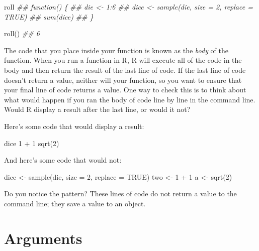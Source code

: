 \documentclass[
  letterpaper,
  DIV=11,
  numbers=noendperiod]{scrbook}
\newenvironment{Shaded}{\begin{snugshade}}{\end{snugshade}}
\newcommand{\AttributeTok}[1]{\textcolor[rgb]{0.40,0.45,0.13}{#1}}
\newcommand{\ConstantTok}[1]{\textcolor[rgb]{0.56,0.35,0.01}{#1}}
\newcommand{\DecValTok}[1]{\textcolor[rgb]{0.68,0.00,0.00}{#1}}
\newcommand{\DocumentationTok}[1]{\textcolor[rgb]{0.37,0.37,0.37}{\textit{#1}}}
\newcommand{\FunctionTok}[1]{\textcolor[rgb]{0.28,0.35,0.67}{#1}}
\newcommand{\NormalTok}[1]{\textcolor[rgb]{0.00,0.23,0.31}{#1}}
\newcommand{\OtherTok}[1]{\textcolor[rgb]{0.00,0.23,0.31}{#1}}
\newcommand{\SpecialCharTok}[1]{\textcolor[rgb]{0.37,0.37,0.37}{#1}}
\begin{document}
\begin{Shaded}
\begin{Highlighting}[]
\NormalTok{roll}
\DocumentationTok{\#\# function() \{}
\DocumentationTok{\#\#   die \textless{}{-} 1:6}
\DocumentationTok{\#\#   dice \textless{}{-} sample(die, size = 2, replace = TRUE)}
\DocumentationTok{\#\#   sum(dice)}
\DocumentationTok{\#\# \}}

\FunctionTok{roll}\NormalTok{()}
\DocumentationTok{\#\# 6}
\end{Highlighting}
\end{Shaded}

The code that you place inside your function is known as the \emph{body}
of the function. When you run a function in R, R will execute all of the
code in the body and then return the result of the last line of code. If
the last line of code doesn't return a value, neither will your
function, so you want to ensure that your final line of code returns a
value. One way to check this is to think about what would happen if you
ran the body of code line by line in the command line. Would R display a
result after the last line, or would it not?

Here's some code that would display a result:

\begin{Shaded}
\begin{Highlighting}[]
\NormalTok{dice}
\DecValTok{1} \SpecialCharTok{+} \DecValTok{1}
\FunctionTok{sqrt}\NormalTok{(}\DecValTok{2}\NormalTok{)}
\end{Highlighting}
\end{Shaded}

And here's some code that would not:

\begin{Shaded}
\begin{Highlighting}[]
\NormalTok{dice }\OtherTok{\textless{}{-}} \FunctionTok{sample}\NormalTok{(die, }\AttributeTok{size =} \DecValTok{2}\NormalTok{, }\AttributeTok{replace =} \ConstantTok{TRUE}\NormalTok{)}
\NormalTok{two }\OtherTok{\textless{}{-}} \DecValTok{1} \SpecialCharTok{+} \DecValTok{1}
\NormalTok{a }\OtherTok{\textless{}{-}} \FunctionTok{sqrt}\NormalTok{(}\DecValTok{2}\NormalTok{)}
\end{Highlighting}
\end{Shaded}

Do you notice the pattern? These lines of code do not return a value to
the command line; they save a value to an object.

\section{Arguments}\label{arguments}
\end{document}

